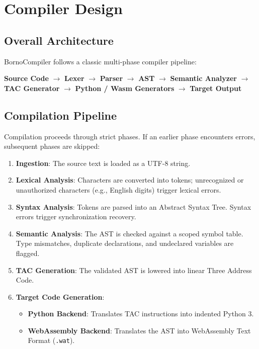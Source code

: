 \documentclass[12pt, a4paper]{report}
\begin{document}
\chapter{Compiler Design}

\section{Overall Architecture}
BornoCompiler follows a classic multi-phase compiler pipeline:
\begin{center}
\textbf{Source Code} $\rightarrow$ \textbf{Lexer} $\rightarrow$ \textbf{Parser} $\rightarrow$ \textbf{AST} $\rightarrow$ \textbf{Semantic Analyzer} $\rightarrow$ \textbf{TAC Generator} $\rightarrow$ \textbf{Python / Wasm Generators} $\rightarrow$ \textbf{Target Output}
\end{center}

\section{Compilation Pipeline}
Compilation proceeds through strict phases. If an earlier phase encounters errors, subsequent phases are skipped:
\begin{enumerate}
    \item \textbf{Ingestion}: The source text is loaded as a UTF-8 string.
    \item \textbf{Lexical Analysis}: Characters are converted into tokens; unrecognized or unauthorized characters (e.g., English digits) trigger lexical errors.
    \item \textbf{Syntax Analysis}: Tokens are parsed into an Abstract Syntax Tree. Syntax errors trigger synchronization recovery.
    \item \textbf{Semantic Analysis}: The AST is checked against a scoped symbol table. Type mismatches, duplicate declarations, and undeclared variables are flagged.
    \item \textbf{TAC Generation}: The validated AST is lowered into linear Three Address Code.
    \item \textbf{Target Code Generation}:
    \begin{itemize}
        \item \textbf{Python Backend}: Translates TAC instructions into indented Python 3.
        \item \textbf{WebAssembly Backend}: Translates the AST into WebAssembly Text Format (\texttt{.wat}).
    \end{itemize}
\end{enumerate}
\end{document}
